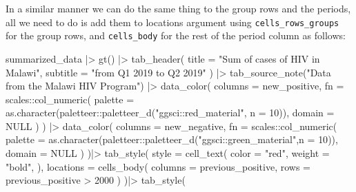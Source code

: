 \documentclass[
]{article}
\newenvironment{Shaded}{\begin{snugshade}}{\end{snugshade}}
\newcommand{\AttributeTok}[1]{\textcolor[rgb]{0.77,0.63,0.00}{#1}}
\newcommand{\ConstantTok}[1]{\textcolor[rgb]{0.00,0.00,0.00}{#1}}
\newcommand{\DecValTok}[1]{\textcolor[rgb]{0.00,0.00,0.81}{#1}}
\newcommand{\FunctionTok}[1]{\textcolor[rgb]{0.00,0.00,0.00}{#1}}
\newcommand{\NormalTok}[1]{#1}
\newcommand{\SpecialCharTok}[1]{\textcolor[rgb]{0.00,0.00,0.00}{#1}}
\newcommand{\StringTok}[1]{\textcolor[rgb]{0.31,0.60,0.02}{#1}}
\begin{document}
In a similar manner we can do the same thing to the group rows and the
periods, all we need to do is add them to locations argument using
\texttt{cells\_rows\_groups} for the group rows, and
\texttt{cells\_body} for the rest of the period column as follows:

\begin{Shaded}
\begin{Highlighting}[]
\NormalTok{summarized\_data }\SpecialCharTok{|\textgreater{}} 
  \FunctionTok{gt}\NormalTok{() }\SpecialCharTok{|\textgreater{}} 
  \FunctionTok{tab\_header}\NormalTok{(}
    \AttributeTok{title =} \StringTok{"Sum of cases of HIV in Malawi"}\NormalTok{,}
    \AttributeTok{subtitle =} \StringTok{"from Q1 2019 to Q2 2019"}
\NormalTok{  ) }\SpecialCharTok{|\textgreater{}} 
  \FunctionTok{tab\_source\_note}\NormalTok{(}\StringTok{"Data from the Malawi HIV Program"}\NormalTok{) }\SpecialCharTok{|\textgreater{}} 
  \FunctionTok{data\_color}\NormalTok{(}
    \AttributeTok{columns =}\NormalTok{ new\_positive,}
    \AttributeTok{fn =}\NormalTok{ scales}\SpecialCharTok{::}\FunctionTok{col\_numeric}\NormalTok{(}
      \AttributeTok{palette =} \FunctionTok{as.character}\NormalTok{(paletteer}\SpecialCharTok{::}\FunctionTok{paletteer\_d}\NormalTok{(}\StringTok{"ggsci::red\_material"}\NormalTok{, }\AttributeTok{n =} \DecValTok{10}\NormalTok{)),}
      \AttributeTok{domain =} \ConstantTok{NULL}
\NormalTok{    )}
\NormalTok{  ) }\SpecialCharTok{|\textgreater{}} 
  \FunctionTok{data\_color}\NormalTok{(}
    \AttributeTok{columns =}\NormalTok{ new\_negative,}
    \AttributeTok{fn =}\NormalTok{ scales}\SpecialCharTok{::}\FunctionTok{col\_numeric}\NormalTok{(}
      \AttributeTok{palette =} \FunctionTok{as.character}\NormalTok{(paletteer}\SpecialCharTok{::}\FunctionTok{paletteer\_d}\NormalTok{(}\StringTok{"ggsci::green\_material"}\NormalTok{,}\AttributeTok{n =} \DecValTok{10}\NormalTok{)),}
      \AttributeTok{domain =} \ConstantTok{NULL}
\NormalTok{    )}
\NormalTok{  )}\SpecialCharTok{|\textgreater{}} 
  \FunctionTok{tab\_style}\NormalTok{(}
    \AttributeTok{style =} \FunctionTok{cell\_text}\NormalTok{(}
      \AttributeTok{color =} \StringTok{"red"}\NormalTok{,}
      \AttributeTok{weight =} \StringTok{"bold"}\NormalTok{,}
\NormalTok{    ),}
    \AttributeTok{locations =} \FunctionTok{cells\_body}\NormalTok{(}
      \AttributeTok{columns =}\NormalTok{ previous\_positive,}
      \AttributeTok{rows =}\NormalTok{ previous\_positive }\SpecialCharTok{\textgreater{}} \DecValTok{2000}
\NormalTok{    )}
\NormalTok{  )}\SpecialCharTok{|\textgreater{}} 
  \FunctionTok{tab\_style}\NormalTok{(}

\end{Highlighting}
\end{Shaded}
\end{document}
